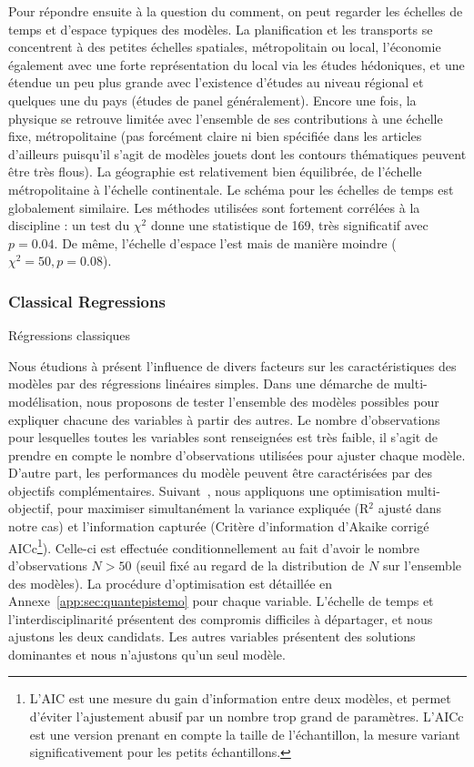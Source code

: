 Pour répondre ensuite à la question du comment, on peut regarder les échelles de temps et d'espace typiques des modèles. La planification et les transports se concentrent à des petites échelles spatiales, métropolitain ou local, l'économie également avec une forte représentation du local via les études hédoniques, et une étendue un peu plus grande avec l'existence d'études au niveau régional et quelques une du pays (études de panel généralement). Encore une fois, la physique se retrouve limitée avec l'ensemble de ses contributions à une échelle fixe, métropolitaine (pas forcément claire ni bien spécifiée dans les articles d'ailleurs puisqu'il s'agit de modèles jouets dont les contours thématiques peuvent être très flous). La géographie est relativement bien équilibrée, de l'échelle métropolitaine à l'échelle continentale. Le schéma pour les échelles de temps est globalement similaire. Les méthodes utilisées sont fortement corrélées à la discipline : un test du $\chi^2$ donne une statistique de 169, très significatif avec $p=0.04$. De même, l'échelle d'espace l'est mais de manière moindre ($\chi^2 = 50, p = 0.08$).


\subsubsection{Classical Regressions}{Régressions classiques}

Nous étudions à présent l'influence de divers facteurs sur les caractéristiques des modèles par des régressions linéaires simples. Dans une démarche de multi-modélisation, nous proposons de tester l'ensemble des modèles possibles pour expliquer chacune des variables à partir des autres. Le nombre d'observations pour lesquelles toutes les variables sont renseignées est très faible, il s'agit de prendre en compte le nombre d'observations utilisées pour ajuster chaque modèle. D'autre part, les performances du modèle peuvent être caractérisées par des objectifs complémentaires. Suivant~\cite{igel2005multi}, nous appliquons une optimisation multi-objectif, pour maximiser simultanément la variance expliquée (R$^2$ ajusté dans notre cas) et l'information capturée (Critère d'information d'Akaike corrigé AICc\footnote{L'AIC est une mesure du gain d'information entre deux modèles, et permet d'éviter l'ajustement abusif par un nombre trop grand de paramètres. L'AICc est une version prenant en compte la taille de l'échantillon, la mesure variant significativement pour les petits échantillons.}). Celle-ci est effectuée conditionnellement au fait d'avoir le nombre d'observations $N>50$ (seuil fixé au regard de la distribution de $N$ sur l'ensemble des modèles). La procédure d'optimisation est détaillée en Annexe~\ref{app:sec:quantepistemo} pour chaque variable. L'échelle de temps et l'interdisciplinarité présentent des compromis difficiles à départager, et nous ajustons les deux candidats. Les autres variables présentent des solutions dominantes et nous n'ajustons qu'un seul modèle.



